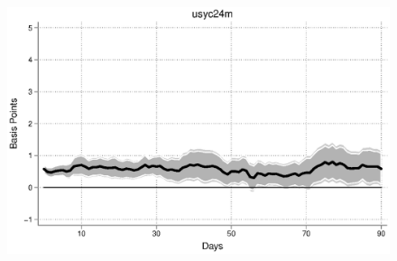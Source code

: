 \documentclass{article}
\begin{document}
\begin{figure}[tbph]
\begin{center}
		\includegraphics[trim={0cm 0cm 0cm 0cm},clip,height=0.3\textheight,width=1\textwidth]{../LagDep-FX/Path/US/usyc24m09-19path.eps} \\
	\end{center}
\end{figure}

\pagebreak[4]
\end{document}
